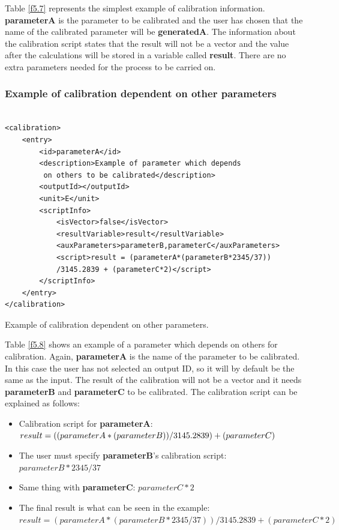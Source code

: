 Table \ref{f5.7} represents the simplest example of calibration information. \textbf{parameterA} is the parameter to be calibrated and the user has chosen that the name of the calibrated parameter will be \textbf{generatedA}. The information about the calibration script states that the result will not be a vector and the value after the calculations will be stored in a variable called \textbf{result}. There are no extra parameters needed for the process to be carried on.

\subsubsection{Example of calibration dependent on other parameters}

\begin{table}[H]
\lstset{language=XML}
\begin{lstlisting}

<calibration>
	<entry>
		<id>parameterA</id>
		<description>Example of parameter which depends
		 on others to be calibrated</description>
		<outputId></outputId>
		<unit>E</unit>
		<scriptInfo>
			<isVector>false</isVector>
			<resultVariable>result</resultVariable>
			<auxParameters>parameterB,parameterC</auxParameters>
			<script>result = (parameterA*(parameterB*2345/37))
			/3145.2839 + (parameterC*2)</script>
		</scriptInfo>
	</entry>
</calibration>
\end{lstlisting}
\caption{Example of calibration dependent on other parameters.}
\label{Table5.8}
\end{table}

Table \ref{f5.8} shows an example of a parameter which depends on others for calibration. Again, \textbf{parameterA} is the name of the parameter to be calibrated. In this case the user has not selected an output ID, so it will by default be the same as the input. The result of the calibration will not be a vector and it needs \textbf{parameterB} and \textbf{parameterC} to be calibrated. The calibration script can be explained as follows:
\begin{itemize}
\item Calibration script for \textbf{parameterA}: $result = ((parameterA*(parameterB))\\			/3145.2839) + (parameterC)$
\item The user must specify \textbf{parameterB}'s calibration script: $parameterB*2345/37$
\item Same thing with \textbf{parameterC}: $parameterC*2$
\item The final result is what can be seen in the example: $result = (parameterA*(parameterB*2345/37))/3145.2839 + (parameterC*2)$
\end{itemize}
\pagebreak

